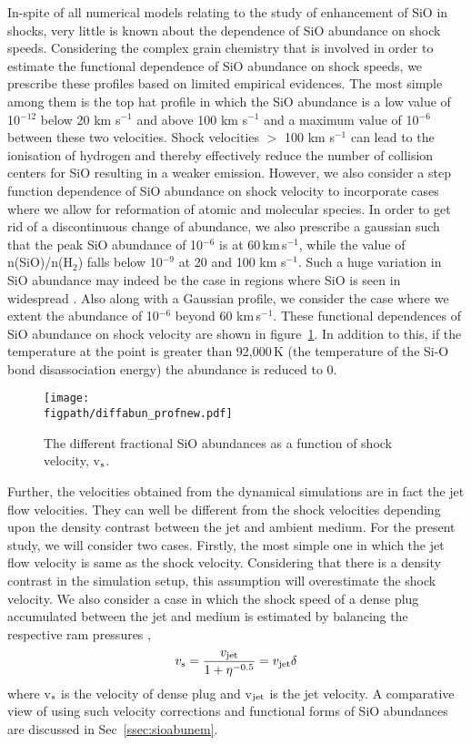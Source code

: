 \documentclass[useAMS,usenatbib]{mn2e}
\newcommand{\figpath}{/Users/bhargavvaidya/MyProject/work/Leeds_Uni/SiOJets_New/PAPER/PFIGS/}
\begin{document}
In-spite of all numerical models relating to the study of enhancement
of SiO in shocks, very little is known about the dependence of SiO
abundance on shock speeds. Considering the complex grain
chemistry that is involved in order to estimate the functional
dependence of SiO abundance on shock speeds, we prescribe these
profiles based on limited empirical evidences. The most simple among
them is the top hat profile in which the SiO abundance is a low value of
10$^{-12}$ below 20 km s$^{-1}$ and above 100 km s$^{-1}$ and a
maximum value of 10$^{-6}$ between these two velocities.
Shock velocities $>$ 100 km s$^{-1}$ can lead to the 
ionisation of hydrogen and thereby effectively reduce the number
of collision centers for SiO resulting in a weaker emission. 
However, we also consider a step function dependence of SiO abundance
on shock velocity to incorporate cases where we allow for reformation
of atomic and molecular species.
In order to get rid of a discontinuous change of abundance, we also
prescribe a gaussian such that the peak SiO abundance of 10$^{-6}$ is at
60\,km\,s$^{-1}$, while the value of n(SiO)/n(H$_{2}$) falls below
10$^{-9}$ at 20 and 100 km s$^{-1}$. Such a huge variation in SiO
abundance may indeed be the case in regions where SiO is seen
in widespread \citep[e.g.,][also see section~\ref{sec:discussion}]
{Lefloch:1998p13983}. Also along with a Gaussian profile, we consider
the case where we extent the abundance of 10$^{-6}$ beyond 60 km\,s$^{-1}$. 
These functional dependences of SiO
abundance on shock velocity are shown in figure~\ref{abun}.  
In addition to this, if the temperature at the point is greater than
92,000\,K (the temperature of the Si-O bond disassociation energy) 
the abundance is reduced to 0. 
%

 \begin{figure}
  \texttt{[image: \\figpath/diffabun\_profnew.pdf]}%
  \caption{The different fractional SiO abundances as a function of
    shock velocity, v$_{\rm s}$.}
  \label{abun}
 \end{figure}

Further, the velocities obtained from the dynamical simulations are in fact the
jet flow velocities. They can well be different from the shock
velocities depending upon the density contrast between the jet and
ambient medium. For the present study, we will consider two
cases. Firstly, the most simple one in which the jet flow velocity is
same as the shock velocity. Considering that there is a density
contrast in the simulation setup, this assumption will
overestimate the shock velocity. We also
consider a case in which the shock speed of a dense plug accumulated
between the jet and medium is estimated by balancing the respective ram
pressures \citep{Masson:1993p9661},
\begin{equation}
\label{eq:shockjetvel}
v_{\rm s} = \frac{v_{\rm jet}}{1 + \eta^{-0.5}} = v_{\rm jet}\delta
\end{equation}
where v$_{\rm s}$ is the velocity of dense plug and v$_{\rm jet}$ is the
jet velocity. A comparative view of using such velocity corrections and
functional forms of SiO abundances are discussed in
Sec~\ref{ssec:sioabunem}.
\end{document}
